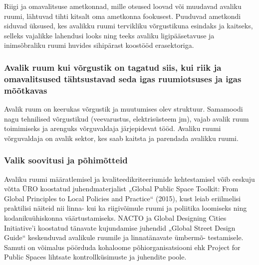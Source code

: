\documentclass[estonian,]{article}
\begin{document}
Riigi ja omavalitsuse ametkonnad, mille otsused loovad või muudavad avaliku ruumi, lähtuvad tihti kitsalt oma ametkonna fookusest. Puuduvad ametkondi siduvad üksused, kes avalikku ruumi tervikliku võrgustikuna esindaks ja kaitseks, selleks vajalikke lahendusi looks ning teeks avaliku ligipääsetavuse ja inimsõbraliku ruumi huvides sihipärast koostööd erasektoriga.

\hypertarget{avalik-ruum-kui-vuxf5rgustik-on-tagatud-siis-kui-riik-ja-omavalitsused-tuxe4htsustavad-seda-igas-ruumiotsuses-ja-igas-muxf5uxf5tkavas}{%
\subsubsection*{Avalik ruum kui võrgustik on tagatud siis, kui riik ja omavalitsused tähtsustavad seda igas ruumiotsuses ja igas mõõtkavas}\label{avalik-ruum-kui-vuxf5rgustik-on-tagatud-siis-kui-riik-ja-omavalitsused-tuxe4htsustavad-seda-igas-ruumiotsuses-ja-igas-muxf5uxf5tkavas}}

Avalik ruum on keerukas võrgustik ja muutumises olev struktuur. Samamoodi nagu tehnilised võrgustikud (veevarustus, elektrisüsteem jm), vajab avalik ruum toimimiseks ja arenguks võrguvaldaja järjepidevat tööd. Avaliku ruumi võrguvaldaja on avalik sektor, kes saab kaitsta ja parendada avalikku ruumi.

\begin{casebox}
\hypertarget{valik-soovitusi-ja-puxf5himuxf5tteid}{%
\subsubsection{Valik soovitusi ja
põhimõtteid}\label{valik-soovitusi-ja-puxf5himuxf5tteid}}

Avaliku ruumi määratlemisel ja kvaliteedikriteeriumide kehtestamisel
võib eeskuju võtta ÜRO koostatud juhendmaterjalist „Global Public Space
Toolkit: From Global Principles to Local Policies and Practice`` (2015),
kust leiab eriilmelisi praktilisi näiteid nii linna- kui ka riigivõimule
ruumi ja poliitika loomiseks ning kodanikuühiskonna väärtustamiseks.
NACTO ja Global Designing Cities Initiative'i koostatud tänavate
kujundamise juhendid „Global Street Design Guide`` keskenduvad avalikule
ruumile ja linnatänavate ümbermõ- testamisele. Samuti on võimalus
pöörduda kohaloome põhiorganisatsiooni ehk Project for Public Spaces
lihtsate kontrollküsimuste ja juhendite poole.
\end{casebox}
\end{document}
